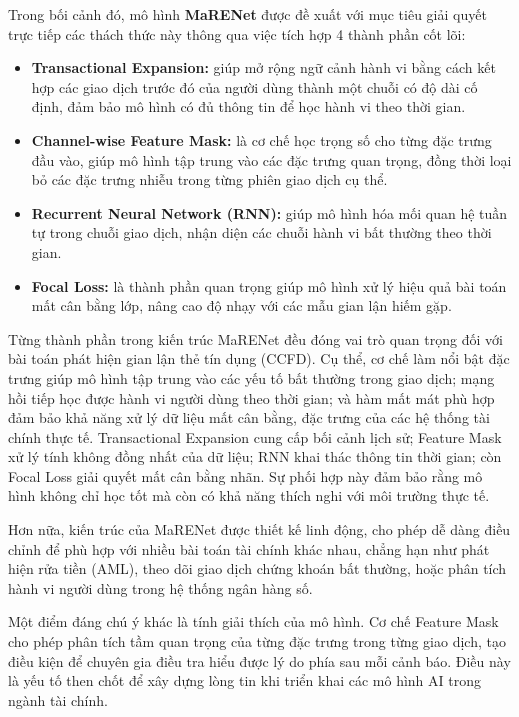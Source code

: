 Trong bối cảnh đó, mô hình \textbf{MaRENet} được đề xuất với mục tiêu giải quyết trực tiếp các thách thức này thông qua việc tích hợp 4 thành phần cốt lõi:

\begin{itemize}
    \item \textbf{Transactional Expansion:} giúp mở rộng ngữ cảnh hành vi bằng cách kết hợp các giao dịch trước đó của người dùng thành một chuỗi có độ dài cố định, đảm bảo mô hình có đủ thông tin để học hành vi theo thời gian.
    \item \textbf{Channel-wise Feature Mask:} là cơ chế học trọng số cho từng đặc trưng đầu vào, giúp mô hình tập trung vào các đặc trưng quan trọng, đồng thời loại bỏ các đặc trưng nhiễu trong từng phiên giao dịch cụ thể.
    \item \textbf{Recurrent Neural Network (RNN):} giúp mô hình hóa mối quan hệ tuần tự trong chuỗi giao dịch, nhận diện các chuỗi hành vi bất thường theo thời gian.
    \item \textbf{Focal Loss:} là thành phần quan trọng giúp mô hình xử lý hiệu quả bài toán mất cân bằng lớp, nâng cao độ nhạy với các mẫu gian lận hiếm gặp.
\end{itemize}

Từng thành phần trong kiến trúc MaRENet đều đóng vai trò quan trọng đối với bài toán phát hiện gian lận thẻ tín dụng (CCFD). Cụ thể, cơ chế làm nổi bật đặc trưng giúp mô hình tập trung vào các yếu tố bất thường trong giao dịch; mạng hồi tiếp học được hành vi người dùng theo thời gian; và hàm mất mát phù hợp đảm bảo khả năng xử lý dữ liệu mất cân bằng, đặc trưng của các hệ thống tài chính thực tế.
Transactional Expansion cung cấp bối cảnh lịch sử; Feature Mask xử lý tính không đồng nhất của dữ liệu; RNN khai thác thông tin thời gian; còn Focal Loss giải quyết mất cân bằng nhãn. Sự phối hợp này đảm bảo rằng mô hình không chỉ học tốt mà còn có khả năng thích nghi với môi trường thực tế.

Hơn nữa, kiến trúc của MaRENet được thiết kế linh động, cho phép dễ dàng điều chỉnh để phù hợp với nhiều bài toán tài chính khác nhau, chẳng hạn như phát hiện rửa tiền (AML), theo dõi giao dịch chứng khoán bất thường, hoặc phân tích hành vi người dùng trong hệ thống ngân hàng số.

Một điểm đáng chú ý khác là tính giải thích của mô hình. Cơ chế Feature Mask cho phép phân tích tầm quan trọng của từng đặc trưng trong từng giao dịch, tạo điều kiện để chuyên gia điều tra hiểu được lý do phía sau mỗi cảnh báo. Điều này là yếu tố then chốt để xây dựng lòng tin khi triển khai các mô hình AI trong ngành tài chính.

